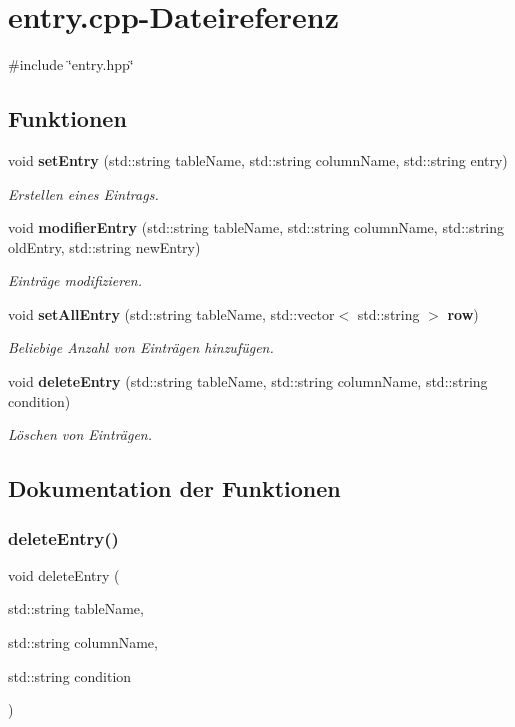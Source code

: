 \section{entry.\+cpp-\/\+Dateireferenz}
\label{entry_8cpp}
{\ttfamily \#include \char`\"{}entry.\+hpp\char`\"{}}\newline
\subsection*{Funktionen}
\begin{DoxyCompactItemize}
\item 
void \textbf{ set\+Entry} (std\+::string table\+Name, std\+::string column\+Name, std\+::string entry)
\begin{DoxyCompactList}\small\item\em Erstellen eines Eintrags. \end{DoxyCompactList}\item 
void \textbf{ modifier\+Entry} (std\+::string table\+Name, std\+::string column\+Name, std\+::string old\+Entry, std\+::string new\+Entry)
\begin{DoxyCompactList}\small\item\em Einträge modifizieren. \end{DoxyCompactList}\item 
void \textbf{ set\+All\+Entry} (std\+::string table\+Name, std\+::vector$<$ std\+::string $>$ \textbf{ row})
\begin{DoxyCompactList}\small\item\em Beliebige Anzahl von Einträgen hinzufügen. \end{DoxyCompactList}\item 
void \textbf{ delete\+Entry} (std\+::string table\+Name, std\+::string column\+Name, std\+::string condition)
\begin{DoxyCompactList}\small\item\em Löschen von Einträgen. \end{DoxyCompactList}\end{DoxyCompactItemize}


\subsection{Dokumentation der Funktionen}
\mbox{\label{entry_8cpp_a1ea4c59c6377c754fd0264b58f476685}} 
\subsubsection{delete\+Entry()}
{\footnotesize\ttfamily void delete\+Entry (\begin{DoxyParamCaption}\item[{std\+::string}]{table\+Name,  }\item[{std\+::string}]{column\+Name,  }\item[{std\+::string}]{condition }\end{DoxyParamCaption})}



